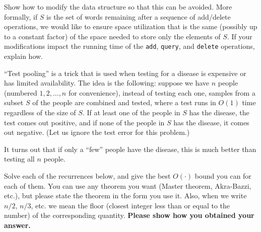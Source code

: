\documentclass[addpoints, 11pt]{exam}
\begin{document}
\begin{questions}
Show how to modify the data structure so that this can be avoided. More formally, if $S$ is the set of words remaining after a sequence of add/delete operations, we would like to ensure space utilization that is the same (possibly up to a constant factor) of the space needed to store only the elements of $S$. If your modifications impact the running time of the \texttt{add}, \texttt{query}, and \texttt{delete} operations, explain how.

``Test pooling'' is a trick that is used when testing for a disease is expensive or has limited availability. The idea is the following: suppose we have $n$ people (numbered $1, 2, \dots, n$ for convenience), instead of testing each one, samples from a subset $S$ of the people are combined and tested, where a test runs in $O(1)$ time regardless of the size of $S$. If at least one of the people in $S$ has the disease, the test comes out positive, and if none of the people in $S$ has the disease, it comes out negative. (Let us ignore the test error for this problem.)

It turns out that if only a ``few'' people have the disease, this is much better than testing all $n$ people.

Solve each of the recurrences below, and give the best $O(\cdot)$ bound you can for each of them. You can use any theorem you want (Master theorem, Akra-Bazzi, etc.), but please state the theorem in the form you use it. Also, when we write $n/2$, $n/3$, etc. we mean the floor (closest integer less than or equal to the number) of the corresponding quantity.  {\bf Please show how you obtained your answer.}


\end{questions}
\end{document}
